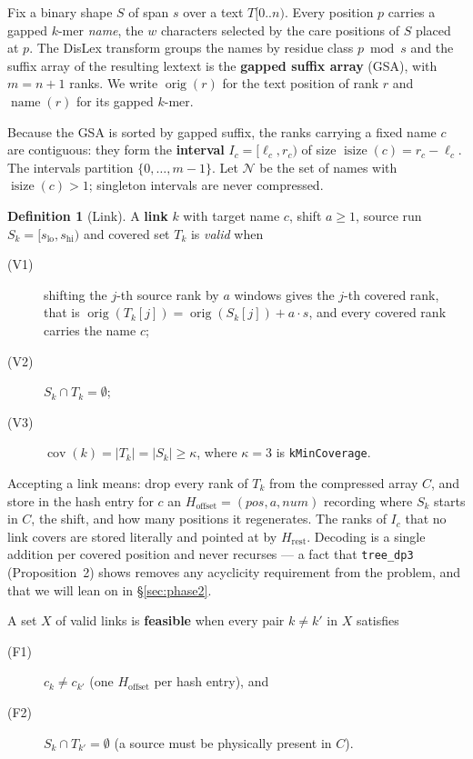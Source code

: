 \documentclass[11pt,a4paper]{article}
\theoremstyle{definition}
\newtheorem{definition}{Definition}
\theoremstyle{plain}
\theoremstyle{remark}
\newcommand{\cov}{\operatorname{cov}}
\newcommand{\orig}{\operatorname{orig}}
\newcommand{\name}{\operatorname{name}}
\newcommand{\isize}{\operatorname{isize}}
\newcommand{\Names}{\mathcal{N}}
\begin{document}
Fix a binary shape $S$ of span $s$ over a text $T[0..n)$. Every position
$p$ carries a gapped $k$-mer \emph{name}, the $w$ characters selected by
the care positions of $S$ placed at $p$. The DisLex transform groups the
names by residue class $p \bmod s$ and the suffix array of the resulting
lextext is the \textbf{gapped suffix array} (GSA), with $m = n+1$ ranks.
We write $\orig(r)$ for the text position of rank $r$ and $\name(r)$ for
its gapped $k$-mer.

Because the GSA is sorted by gapped suffix, the ranks carrying a fixed
name $c$ are contiguous: they form the \textbf{interval}
$I_c = [\ell_c, r_c)$ of size $\isize(c) = r_c - \ell_c$. The intervals
partition $\{0,\dots,m-1\}$. Let $\Names$ be the set of names with
$\isize(c) > 1$; singleton intervals are never compressed.

\begin{definition}[Link]
\label{def:link}
A \textbf{link} $k$ with target name $c$, shift $a \ge 1$, source run
$S_k = [s_{\mathrm{lo}}, s_{\mathrm{hi}})$ and covered set $T_k$ is
\emph{valid} when
\begin{description}
\item[(V1)] shifting the $j$-th source rank by $a$ windows gives the
  $j$-th covered rank, that is
  $\orig(T_k[j]) = \orig(S_k[j]) + a\cdot s$, and every covered rank
  carries the name $c$;
\item[(V2)] $S_k \cap T_k = \emptyset$;
\item[(V3)] $\cov(k) = |T_k| = |S_k| \ge \kappa$, where $\kappa = 3$ is
  \texttt{kMinCoverage}.
\end{description}
\end{definition}

Accepting a link means: drop every rank of $T_k$ from the compressed
array $C$, and store in the hash entry for $c$ an
$H_{\mathrm{offset}} = (\mathit{pos}, a, \mathit{num})$ recording where
$S_k$ starts in $C$, the shift, and how many positions it regenerates.
The ranks of $I_c$ that no link covers are stored literally and pointed
at by $H_{\mathrm{rest}}$. Decoding is a single addition per covered
position and never recurses --- a fact that \texttt{tree\_dp3}
(Proposition~2) shows removes any acyclicity requirement from the
problem, and that we will lean on in \S\ref{sec:phase2}.

A set $X$ of valid links is \textbf{feasible} when every pair
$k \ne k'$ in $X$ satisfies

\begin{description}
\item[(F1)] $c_k \ne c_{k'}$ (one $H_{\mathrm{offset}}$ per hash entry),
  and
\item[(F2)] $S_k \cap T_{k'} = \emptyset$ (a source must be physically
  present in $C$).
\end{description}
\end{document}
